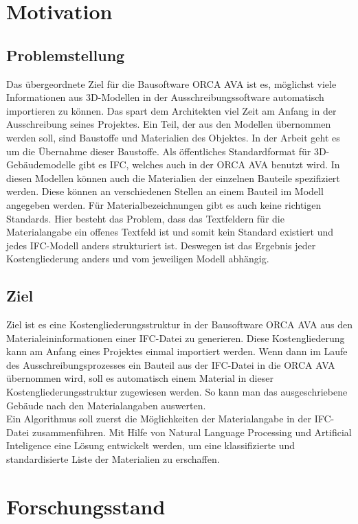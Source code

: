 \begin{onehalfspace}
\section{Motivation}
\subsection{Problemstellung}
\label{s:intro}
Das übergeordnete Ziel für die Bausoftware ORCA AVA ist es, möglichst viele Informationen aus 3D-Modellen in der Ausschreibungssoftware automatisch importieren zu können. Das spart dem Architekten viel Zeit am Anfang in der Ausschreibung seines Projektes. Ein Teil, der aus den Modellen übernommen werden soll, sind Baustoffe und Materialien des Objektes. In der Arbeit geht es um die Übernahme dieser Baustoffe.
Als öffentliches Standardformat für 3D-Gebäudemodelle gibt es IFC, welches auch in der ORCA AVA benutzt wird. In diesen Modellen können auch die Materialien der einzelnen Bauteile spezifiziert werden. Diese können an verschiedenen Stellen an einem Bauteil im Modell angegeben werden. Für Materialbezeichnungen gibt es auch keine richtigen Standards. Hier besteht das Problem, dass das Textfeldern für die Materialangabe ein offenes Textfeld ist und somit kein Standard existiert und jedes IFC-Modell anders strukturiert ist. Deswegen ist das Ergebnis jeder Kostengliederung anders und vom jeweiligen Modell abhängig.

\subsection{Ziel}
Ziel ist es eine Kostengliederungsstruktur in der Bausoftware ORCA AVA aus den Materialeininformationen einer IFC-Datei zu generieren. Diese Kostengliederung kann am Anfang eines Projektes einmal importiert werden. Wenn dann im Laufe des Ausschreibungsprozesses ein Bauteil aus der IFC-Datei in die ORCA AVA übernommen wird, soll es automatisch einem Material in dieser Kostengliederungsstruktur zugewiesen werden. So kann man das ausgeschriebene Gebäude nach den Materialangaben auswerten.
\\


Ein Algorithmus soll zuerst die Möglichkeiten der Materialangabe in der IFC-Datei zusammenführen. Mit Hilfe von Natural Language Processing und Artificial Inteligence eine Lösung entwickelt werden, um eine klassifizierte und standardisierte Liste der Materialien zu erschaffen. 


\section{Forschungsstand}

\end{onehalfspace}
